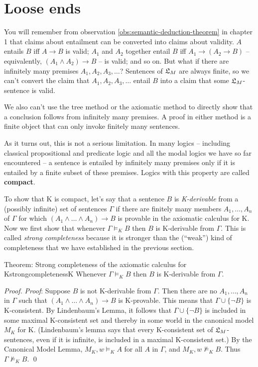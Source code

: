 \section{Loose ends}\label{sec:looseends}

You will remember from observation \ref{obs:semantic-deduction-theorem} in
chapter 1 that claims about entailment can be converted into claims about
validity. $A$ entails $B$ iff $A \to B$ is valid; $A_{1}$ and $A_{2}$ together
entail $B$ iff $A_{1} \to (A_{2} \to B)$ -- equivalently,
$(A_{1}\land A_{2}) \to B$ -- is valid; and so on. But what if there are
infinitely many premises $A_{1},A_{2},A_{3},\ldots$? Sentences of $\mathfrak{L}_{M}$ are
always finite, so we can't convert the claim that $A_{1},A_{2},A_{3},\ldots$
entail $B$ into a claim that some $\mathfrak{L}_{M}$-sentence is valid.

We also can't use the tree method or the axiomatic method to directly show that
a conclusion follows from infinitely many premises. A proof in either method is
a finite object that can only invoke finitely many sentences.

As it turns out, this is not a serious limitation. In many logics -- including
classical propositional and predicate logic and all the modal logics we have so
far encountered -- a sentence is entailed by infinitely many premises only if it
is entailed by a finite subset of these premises. Logics with this property are
called \textbf{compact}.

To show that K is compact, let's say that a sentence $B$ is \emph{K-derivable}
from a (possibly infinite) set of sentences $\Gamma$ if there are finitely many
members $A_{1},\ldots,A_{n}$ of $\Gamma$ for which
$(A_1 \land \ldots \land A_n) \to B$ is provable in the axiomatic calculus for
K. Now we first show that whenever $\Gamma \models_{K} B$ then $B$ is
K-derivable from $\Gamma$. This is called \emph{strong completeness} because it
is stronger than the (``weak'') kind of completeness that we have established in
the previous section.

\begin{theorem}{Theorem: Strong completeness of the axiomatic calculus for K}{strongcompletenessK}
  Whenever $\Gamma \models_{K} B$ then $B$ is K-derivable from $\Gamma$.
\end{theorem}
\begin{proof}
  \emph{Proof}: Suppose $B$ is not K-derivable from $\Gamma$. Then there are no
  $A_1, \ldots, A_n$ in $\Gamma$ such that $(A_1 \land \ldots \land A_n) \to B$
  is K-provable. This means that $\Gamma \cup \{ \neg B \}$ is K-consistent. By
  Lindenbaum's Lemma, it follows that $\Gamma \cup \{ \neg B \}$ is included in
  some maximal K-consistent set and thereby in some world in the canonical model
  $M_{K}$ for K. (Lindenbaum's lemma says that every K-consistent set of
  $\mathfrak{L}_{M}$-sentences, even if it is infinite, is included in a maximal
  K-consistent set.) By the Canonical Model Lemma, $M_{K}, w \models_K A$ for
  all $A$ in $\Gamma$, and $M_{K}, w \not\models_K B$. Thus
  $\Gamma \not\models_K B$. \qed
\end{proof}

